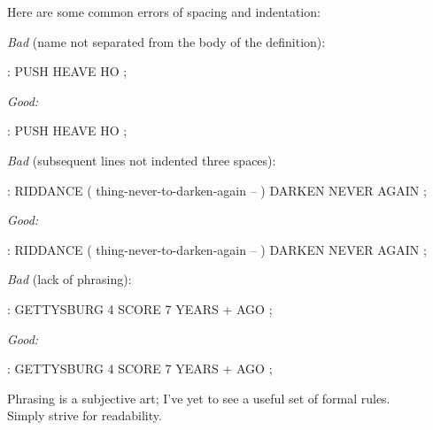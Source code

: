 %
Here are some common errors of spacing and indentation:

\goodbreak\bigskip\noindent
\emph{Bad} (name not separated from the body of the definition):
\begin{Code}
: PUSH HEAVE HO ;
\end{Code}
\emph{Good:}
\begin{Code}
: PUSH   HEAVE HO ;
\end{Code}
\emph{Bad} (subsequent lines not indented three spaces):
\begin{Code}
: RIDDANCE  ( thing-never-to-darken-again -- )
DARKEN  NEVER AGAIN ;
\end{Code}
\emph{Good:}
\begin{Code}
: RIDDANCE  ( thing-never-to-darken-again -- )
   DARKEN  NEVER AGAIN ;
\end{Code}
\emph{Bad} (lack of phrasing):
\begin{Code}
: GETTYSBURG   4 SCORE 7 YEARS + AGO ;
\end{Code}
\goodbreak\noindent
\emph{Good:}
\begin{Code}
: GETTYSBURG   4 SCORE   7 YEARS +   AGO ;
\end{Code}
Phrasing is a subjective art;
I've yet to see a useful set of formal rules.\\
Simply strive for readability.%
%
%
%

